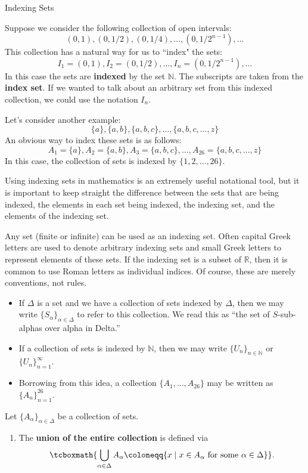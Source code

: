 \begin{section}{Indexing Sets}

Suppose we consider the following collection of open intervals:
\[
(0,1), (0,1/2), (0,1/4), \ldots, (0,1/2^{n-1}), \ldots
\]
This collection has a natural way for us to ``index" the sets:
\[
I_1=(0,1), I_2=(0,1/2), \ldots, I_n=(0,1/2^{n-1}), \ldots
\]
In this case the sets are \textbf{indexed} by the set $\mathbb{N}$.  The subscripts are taken from the \textbf{index set}.  If we wanted to talk about an arbitrary set from this indexed collection, we could use the notation $I_n$.

Let's consider another example:
\[
\{a\}, \{a,b\}, \{a,b,c\}, \ldots, \{a,b,c,\ldots,z\}
\]
An obvious way to index these sets is as follows:
\[
A_1=\{a\}, A_2=\{a,b\}, A_3=\{a,b,c\}, \ldots, A_{26}=\{a,b,c,\ldots,z\}
\]
In this case, the collection of sets is indexed by $\{1,2,\ldots, 26\}$.

Using indexing sets in mathematics is an extremely useful notational tool, but it is important to keep straight the difference between the sets that are being indexed, the elements in each set being indexed, the indexing set, and the elements of the indexing set.

Any set (finite or infinite) can be used as an indexing set. Often capital Greek letters are used to denote arbitrary indexing sets and small Greek letters to represent elements of these sets. If the indexing set is a subset of $\mathbb{R}$, then it is common to use Roman letters as individual indices. Of course, these are merely conventions, not rules.
\begin{itemize}
\item If $\Delta$ is a set and we have a collection of sets indexed by $\Delta$, then we may write $\{S_{\alpha}\}_{\alpha\in \Delta}$ to refer to this collection. We read this as ``the set of $S$-sub-alphas over alpha in Delta.''
\item If a collection of sets is indexed by $\mathbb{N}$, then we may write $\{U_n\}_{n\in\mathbb{N}}$ or $\{U_n\}_{n=1}^{\infty}$.
\item Borrowing from this idea, a collection $\{A_1,\ldots,A_{26}\}$ may be written as $\{A_n\}_{n=1}^{26}$.
\end{itemize}

\begin{definition}
Let $\{A_{\alpha}\}_{\alpha\in\Delta}$ be a collection of sets.
\begin{enumerate}[label=\textrm{(\alph*)}]
\item The \textbf{union of the entire collection} is defined via
\[
\tcboxmath{\bigcup_{\alpha\in\Delta} A_{\alpha}\coloneqq \{x\mid x\in A_{\alpha} \mbox{ for some }\alpha\in \Delta\}}.
\]


\end{enumerate}
\end{definition}
\end{section}
